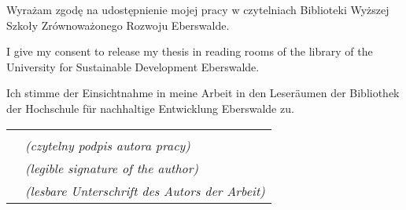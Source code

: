 \thispagestyle{empty}

\begin{singlespace}
	\begin{po}
		Wyrażam zgodę na udostępnienie mojej pracy w czytelniach Biblioteki Wyższej Szkoły Zrównoważonego Rozwoju Eberswalde. 
	\end{po}
	
	\bigskip
	
	I give my consent to release my thesis in reading rooms of the library of the University for Sustainable Development Eberswalde.
	
	\bigskip
	
	\begin{de}
		Ich stimme der Einsichtnahme in meine Arbeit in den Leseräumen der Bibliothek der Hochschule für nachhaltige Entwicklung Eberswalde zu.
	\end{de}
	
	\vspace{2cm}
	
	\begin{tabular}{ll}
		\makebox[6.8cm] & \makebox[7.4cm]{\dotfill}\\
		& \textit{(czytelny podpis autora pracy)} \\
		& \textit{(legible signature of the author)} \\
		& \textit{(lesbare Unterschrift des Autors der Arbeit)} \\
	\end{tabular}
\end{singlespace}
